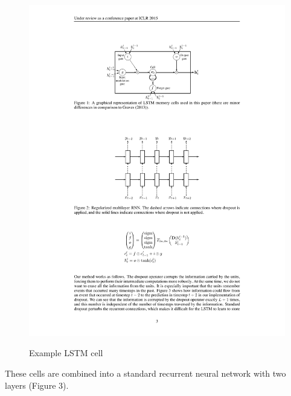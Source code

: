 \documentclass{article} %
\begin{document}
\begin{figure}
	\includegraphics[width=\textwidth]{LSTMeqs}
        \label{fig2}
        \caption{Example LSTM cell}
\end{figure}
These cells are combined into a standard recurrent neural network with two layers (Figure 3).
\end{document}
